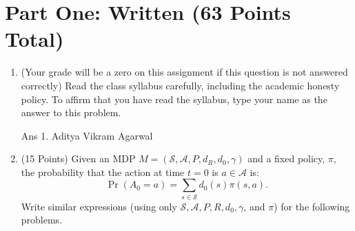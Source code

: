 \documentclass[]{article}
\begin{document}
\section*{Part One: Written (63 Points Total)}
\begin{enumerate}
    \item (Your grade will be a zero on this assignment if this question is not answered correctly) Read the class syllabus carefully, including the academic honesty policy. To affirm that you have read the syllabus, type your name as the answer to this problem. 

	{
		\color{blue}
			Ans 1. Aditya Vikram Agarwal
	}

    \item (15 Points) Given an MDP $M=(\mathcal S, \mathcal A, P, d_R, d_0, \gamma)$ and a fixed policy, $\pi$, the probability that the action at time $t=0$ is $a \in \mathcal A$ is:
    \begin{equation}
        \Pr(A_0=a)=\sum_{s \in \mathcal S} d_0(s) \pi(s,a).
    \end{equation}
    Write similar expressions (using only $\mathcal S,\mathcal A,P,R,d_0,\gamma$, and $\pi$) for the following problems.\\
    

\end{enumerate}
\end{document}
